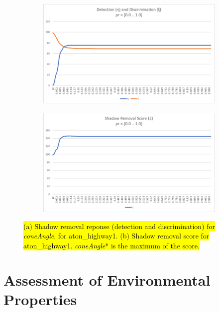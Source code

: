 \begin{figure}
  \centering
  \begin{subfigure}{.8\linewidth}
  \includegraphics[width=1\linewidth]{figures/sensitive_param.jpg}
  \caption{}
\end{subfigure}
\hfill
\begin{subfigure}{.8\linewidth}
  \includegraphics[width=1\linewidth]{figures/sensitive_param_score.jpg}
  \caption{}
\end{subfigure}

\caption{\hl{(a) Shadow removal reponse (detection and discrimination) for \textit{coneAngle}, for aton\_highway1. (b) Shadow removal score for aton\_highway1. \textit{coneAngle}* is the maximum of the score.}}
\label{fig:coneAngle_iterate}
\end{figure}

\section{Assessment of Environmental Properties} \label{section:envassess}

